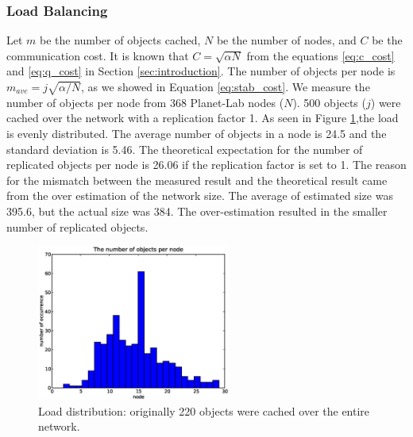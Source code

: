 \documentclass[9.5pt,journal,final,finalsubmission,twocolumn]{IEEEtran}
\begin{document}
\subsubsection{Load Balancing}
Let $m$ be the number of objects cached, $N$ be the number of nodes, and 
$C$ be the communication cost. It is known that $C=\sqrt{\alpha N}$ from 
the equations \eqref{eq:c_cost} and \eqref{eq:q_cost} in Section 
\ref{sec:introduction}.
The number of objects per node is $m_{ave}=j\sqrt{\alpha/N}$, as we
showed in Equation \ref{eq:stab_cost}. 
We measure the number of objects per node from 368 Planet-Lab nodes ($N$).
500 objects ($j$) were cached over the network with a replication 
factor 1.
As seen in Figure \ref{fig:loadbal_hist},the load is evenly distributed. 
The average number of objects in a node is 24.5 and the standard deviation 
is 5.46.
The theoretical expectation for the number of replicated objects per node
is 26.06 if the replication factor is set to 1.
The reason for the mismatch between the measured result and the theoretical 
result came from the over estimation of the network size. 
The average of estimated size was 395.6, but the actual size was 384.
The over-estimation resulted in the smaller number of replicated objects.
\begin{figure}[h]
\centering
\includegraphics[width=2.5in]{load_bal_hist.eps}
\caption{Load distribution: originally 220 objects were cached over the entire network. } \label{fig:loadbal_hist}
\end{figure}

\iffalse
\end{document}
